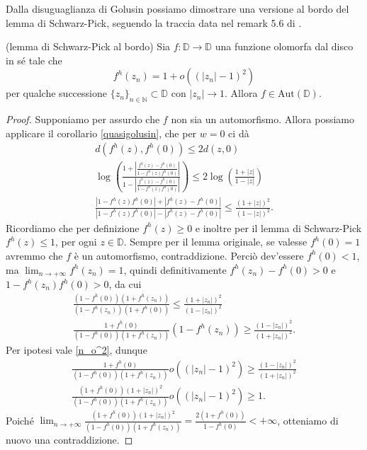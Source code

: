 Dalla disuguaglianza di Golusin possiamo dimostrare una versione al bordo del lemma di Schwarz-Pick, seguendo la traccia data nel remark 5.6 di \cite{BKR}.

\begin{thm} \label{boundary_schwarz_pick}
  (lemma di Schwarz-Pick al bordo) Sia $f:\mathbb{D} \longrightarrow \mathbb{D}$ una funzione olomorfa dal disco in sé tale che
  \begin{equation} \label{n_o^2}
    f^h(z_n)=1+o((|z_n|-1)^2)
  \end{equation}
  per qualche successione $\{z_n\}_{n \in \mathbb{N}} \subset \mathbb{D}$ con $|z_n| \longrightarrow 1$. Allora $f \in \text{Aut}(\mathbb{D})$.
\end{thm}

\begin{proof}
  Supponiamo per assurdo che $f$ non sia un automorfismo. Allora possiamo applicare il corollario \ref{quasigolusin}, che per $w=0$ ci dà
  \begin{align*}
    d(f^h(z), f^h(0)) \le 2d(z,0) \\
    \log{\left(\frac{1+\left|\frac{f^h(z)-f^h(0)}{1-f^h(z)f^h(0)}\right|}{1-\left|\frac{f^h(z)-f^h(0)}{1-f^h(z)f^h(0)}\right|}\right)} \le 2\log{\left(\frac{1+|z|}{1-|z|}\right)} \\
    \frac{|1-f^h(z)f^h(0)|+|f^h(z)-f^h(0)|}{|1-f^h(z)f^h(0)|-|f^h(z)-f^h(0)|} \le \frac{(1+|z|)^2}{(1-|z|)^2}.
  \end{align*}
  Ricordiamo che per definizione $f^h(z) \ge 0$ e inoltre per il lemma di Schwarz-Pick $f^h(z) \le 1$, per ogni $z \in \mathbb{D}$. Sempre per il lemma originale, se valesse $f^h(0)=1$ avremmo che $f$ è un automorfismo, contraddizione. Perciò dev'essere $f^h(0)<1$, ma $\displaystyle \lim_{n \longrightarrow +\infty} f^h(z_n)=1$, quindi definitivamente $f^h(z_n)-f^h(0)>0$ e $1-f^h(z_n)f^h(0)>0$, da cui
  \begin{align*}
    \frac{(1-f^h(0))(1+f^h(z_n))}{(1-f^h(z_n))(1+f^h(0))} \le \frac{(1+|z_n|)^2}{(1-|z_n|)^2} \\
    \frac{1+f^h(0)}{(1-f^h(0))(1+f^h(z_n))}(1-f^h(z_n)) \ge \frac{(1-|z_n|)^2}{(1+|z_n|)^2}.
  \end{align*}
  Per ipotesi vale \eqref{n_o^2}, dunque
  \begin{align*}
    \frac{1+f^h(0)}{(1-f^h(0))(1+f^h(z_n))}o((|z_n|-1)^2) \ge \frac{(1-|z_n|)^2}{(1+|z_n|)^2} \\
    \frac{(1+f^h(0))(1+|z_n|)^2}{(1-f^h(0))(1+f^h(z_n))}o((|z_n|-1)^2) \ge 1.
  \end{align*}
  Poiché $\displaystyle \lim_{n \longrightarrow +\infty} \frac{(1+f^h(0))(1+|z_n|)^2}{(1-f^h(0))(1+f^h(z_n))}=\frac{2(1+f^h(0))}{1-f^h(0)} < +\infty$, otteniamo di nuovo una contraddizione.
\end{proof}
